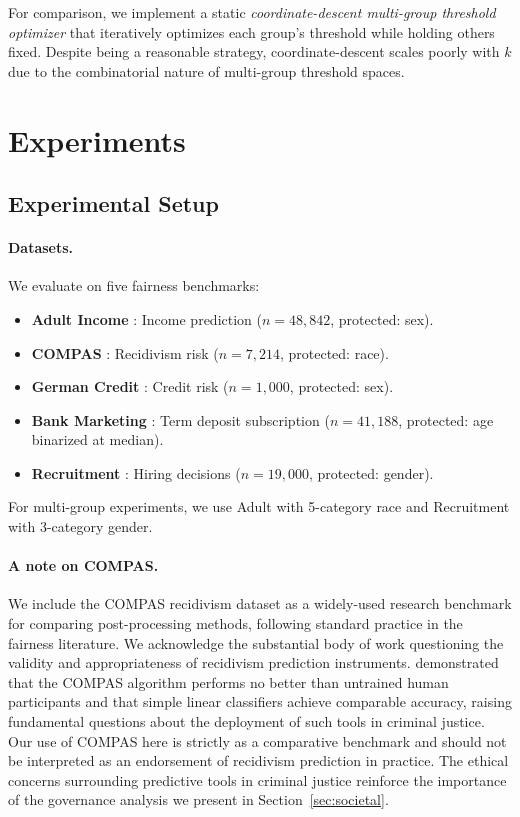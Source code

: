 \documentclass[letterpaper]{article} %
\theoremstyle{definition}
\begin{document}
For comparison, we implement a static \emph{coordinate-descent multi-group threshold optimizer} that iteratively optimizes each group's threshold while holding others fixed. Despite being a reasonable strategy, coordinate-descent scales poorly with $k$ due to the combinatorial nature of multi-group threshold spaces.

\section{Experiments}
\label{sec:experiments}

\subsection{Experimental Setup}

\paragraph{Datasets.} We evaluate on five fairness benchmarks:
\begin{itemize}
    \item \textbf{Adult Income} \cite{dua2019uci}: Income prediction ($n=48{,}842$, protected: sex).
    \item \textbf{COMPAS} \cite{angwin2016machine}: Recidivism risk ($n=7{,}214$, protected: race).
    \item \textbf{German Credit} \cite{dua2019uci}: Credit risk ($n=1{,}000$, protected: sex).
    \item \textbf{Bank Marketing} \cite{moro2014data}: Term deposit subscription ($n=41{,}188$, protected: age binarized at median).
    \item \textbf{Recruitment} \cite{recruitment2023}: Hiring decisions ($n=19{,}000$, protected: gender).
\end{itemize}
For multi-group experiments, we use Adult with 5-category race and Recruitment with 3-category gender.

\paragraph{A note on COMPAS.} We include the COMPAS recidivism dataset as a widely-used research benchmark for comparing post-processing methods, following standard practice in the fairness literature. We acknowledge the substantial body of work questioning the validity and appropriateness of recidivism prediction instruments. \citet{dressel2018accuracy} demonstrated that the COMPAS algorithm performs no better than untrained human participants and that simple linear classifiers achieve comparable accuracy, raising fundamental questions about the deployment of such tools in criminal justice. Our use of COMPAS here is strictly as a comparative benchmark and should not be interpreted as an endorsement of recidivism prediction in practice. The ethical concerns surrounding predictive tools in criminal justice reinforce the importance of the governance analysis we present in Section~\ref{sec:societal}.
\end{document}
